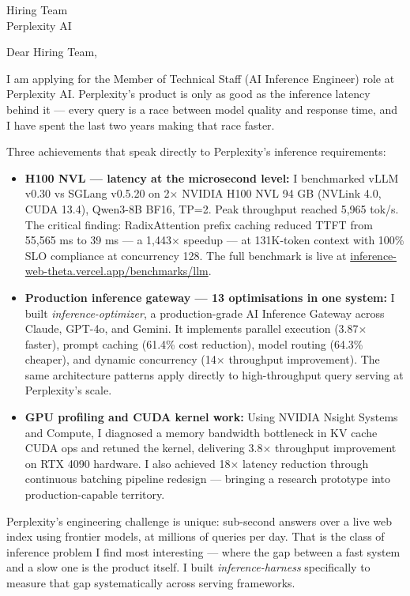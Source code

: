 \documentclass[12pt,a4paper]{letter}
\date{\today}
\begin{document}
\begin{letter}{Hiring Team \\ Perplexity AI}

\opening{Dear Hiring Team,}

I am applying for the Member of Technical Staff (AI Inference Engineer) role at Perplexity AI. Perplexity's product is only as good as the inference latency behind it — every query is a race between model quality and response time, and I have spent the last two years making that race faster.

Three achievements that speak directly to Perplexity's inference requirements:

\begin{itemize}
  \item \textbf{H100 NVL — latency at the microsecond level:} I benchmarked vLLM v0.30 vs SGLang v0.5.20 on 2$\times$ NVIDIA H100 NVL 94 GB (NVLink 4.0, CUDA 13.4), Qwen3-8B BF16, TP=2. Peak throughput reached 5,965 tok/s. The critical finding: RadixAttention prefix caching reduced TTFT from 55,565 ms to 39 ms — a 1,443$\times$ speedup — at 131K-token context with 100\% SLO compliance at concurrency 128. The full benchmark is live at \href{https://inference-web-theta.vercel.app/benchmarks/llm}{inference-web-theta.vercel.app/benchmarks/llm}.

  \item \textbf{Production inference gateway — 13 optimisations in one system:} I built \textit{inference-optimizer}, a production-grade AI Inference Gateway across Claude, GPT-4o, and Gemini. It implements parallel execution (3.87$\times$ faster), prompt caching (61.4\% cost reduction), model routing (64.3\% cheaper), and dynamic concurrency (14$\times$ throughput improvement). The same architecture patterns apply directly to high-throughput query serving at Perplexity's scale.

  \item \textbf{GPU profiling and CUDA kernel work:} Using NVIDIA Nsight Systems and Compute, I diagnosed a memory bandwidth bottleneck in KV cache CUDA ops and retuned the kernel, delivering 3.8$\times$ throughput improvement on RTX 4090 hardware. I also achieved 18$\times$ latency reduction through continuous batching pipeline redesign — bringing a research prototype into production-capable territory.
\end{itemize}

Perplexity's engineering challenge is unique: sub-second answers over a live web index using frontier models, at millions of queries per day. That is the class of inference problem I find most interesting — where the gap between a fast system and a slow one is the product itself. I built \textit{inference-harness} specifically to measure that gap systematically across serving frameworks.


\end{letter}
\end{document}
